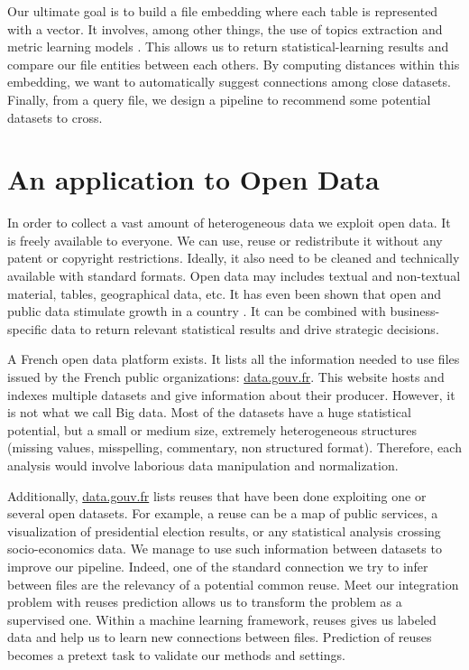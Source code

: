\documentclass[a4paper]{article}
\begin{document}
	Our ultimate goal is to build a file embedding where each table is represented with a vector. It involves, among other things, the use of topics extraction \cite{ref2} and metric learning models \cite{ref3}. This allows us to return statistical-learning results and compare our file entities between each others. By computing distances within this embedding, we want to automatically suggest connections among close datasets. Finally, from a query file, we design a pipeline to recommend some potential datasets to cross.
	
	\section{An application to Open Data}
	
	In order to collect a vast amount of heterogeneous data we exploit open data. It is freely available to everyone. We can use, reuse or redistribute it without any patent or copyright restrictions. Ideally, it also need to be cleaned and technically available with standard formats. Open data may includes textual and non-textual material, tables, geographical data, etc. It has even been shown that open and public data stimulate growth in a country \cite{ref13}. It can be combined with business-specific data to return relevant statistical results and drive strategic decisions. 
	
	A French open data platform exists. It lists all the information needed to use files issued by the French public organizations: \href{http://www.data.gouv.fr/fr/}{data.gouv.fr}. This website hosts and indexes multiple datasets and give information about their producer. However, it is not what we call Big data. Most of the datasets have a huge statistical potential, but a small or medium size, extremely heterogeneous structures (missing values, misspelling, commentary, non structured format). Therefore, each analysis would involve laborious data manipulation and normalization.
	
	Additionally, \href{http://www.data.gouv.fr/fr/}{data.gouv.fr} lists reuses that have been done exploiting one or several open datasets. For example, a reuse can be a map of public services, a visualization of presidential election results, or any statistical analysis crossing socio-economics data. We manage to use such information between datasets to improve our pipeline. Indeed, one of the standard connection we try to infer between files are the relevancy of a potential common reuse. Meet our integration problem with reuses prediction allows us to transform the problem as a supervised one. Within a machine learning framework, reuses gives us labeled data and help us to learn new connections between files. Prediction of reuses becomes a pretext task to validate our methods and settings.
	
\end{document}
